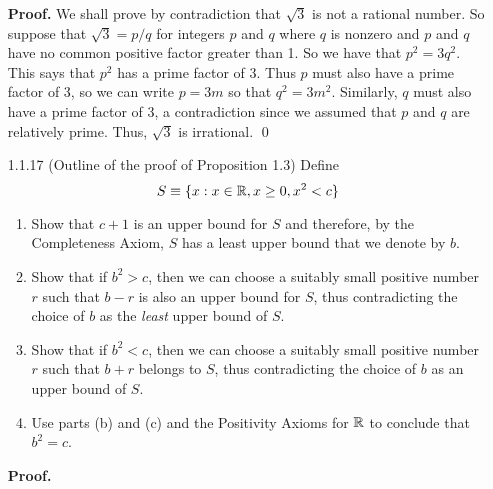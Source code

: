 \begin{enumerate}
      \textbf{Proof.} We shall prove by contradiction that $\sqrt{3}$ is not a 
      rational number. So suppose that $\sqrt{3} = p/q$ for integers $p$ and $q$
      where $q$ is nonzero and $p$ and $q$ have no common positive factor 
      greater than 1. So we have that $p^2 = 3q^2$. This says that $p^2$ has a  
      prime factor of 3. Thus $p$ must also have a prime factor of 3, so we can 
      write $p = 3m$ so that $q^2 = 3m^2$. Similarly, $q$ must also have a prime
      factor of 3, a contradiction since we assumed that $p$ and $q$ are
      relatively prime. Thus, $\sqrt{3}$ is irrational. \qed
   \item[1.1.17]  (Outline of the proof of Proposition 1.3) Define
                  $$S \equiv \{x : x \in \mathbb{R}, x \ge 0, x^2 < c\}$$
                  \begin{enumerate}
                     \item Show that $c + 1$ is an upper bound for $S$ and
                           therefore, by the Completeness Axiom, $S$ has a least
                           upper bound that we denote by $b$.
                     \item Show that if $b^2 > c$, then we can choose a suitably
                           small positive number $r$ such that $b - r$ is also 
                           an upper bound for $S$, thus contradicting the choice
                           of $b$ as the \textit{least} upper bound of $S$.
                     \item Show that if $b^2 < c$, then we can choose a suitably
                           small positive number $r$ such that $b + r$ belongs 
                           to $S$, thus contradicting the choice of $b$ as an 
                           upper bound of $S$.
                     \item Use parts (b) and (c) and the Positivity Axioms for
                           $\mathbb{R}$ to conclude that $b^2 = c$.
                  \end{enumerate}
	  
	   \textbf{Proof.}
      

\end{enumerate}
